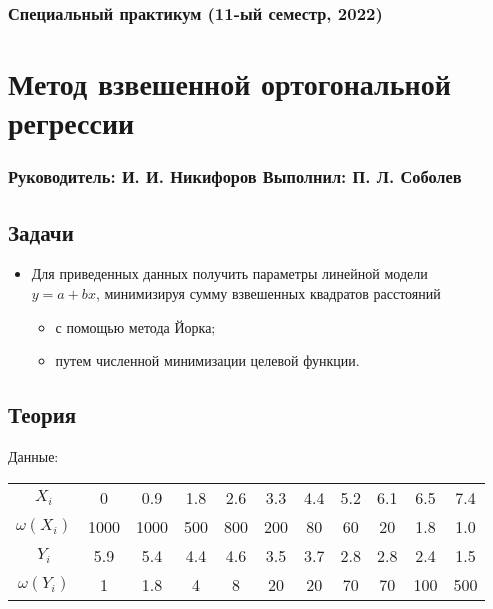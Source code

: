 \documentclass[a4paper, oneside]{article}
\begin{document}
\subsubsection*{Специальный практикум (11-ый семестр, 2022)}
\section*{Метод взвешенной ортогональной регрессии}
\subsubsection*{Руководитель: И. И. Никифоров \hspace{2em} Выполнил: П. Л. Соболев}

\vspace{3em}

\subsection*{Задачи}

\begin{itemize}
  \setlength\itemsep{-0.1em}
  \item Для приведенных данных получить параметры линейной модели \\ $ y = a + b x $, минимизируя сумму взвешенных квадратов расстояний
  \begin{itemize}
    \item с помощью метода Йорка;
    \item путем численной минимизации целевой функции.
  \end{itemize}
\end{itemize}

\subsection*{Теория}

Данные:

\begin{table}[h]
  \centering
  \begin{tabular}{c|cccccccccc}
    \toprule
    $ X_i $ & 0 & 0.9 & 1.8 & 2.6 & 3.3 & 4.4 & 5.2 & 6.1 & 6.5 & 7.4 \\
    $ \omega(X_i) $ & 1000 & 1000 & 500 & 800 & 200 & 80 & 60 & 20 & 1.8 & 1.0 \\
    \midrule
    $ Y_i $ & 5.9 & 5.4 & 4.4 & 4.6 & 3.5 & 3.7 & 2.8 & 2.8 & 2.4 & 1.5 \\
    $ \omega(Y_i) $ & 1 & 1.8 & 4 & 8 & 20 & 20 & 70 & 70 & 100 & 500 \\
    \bottomrule
  \end{tabular}
\end{table}
\end{document}
